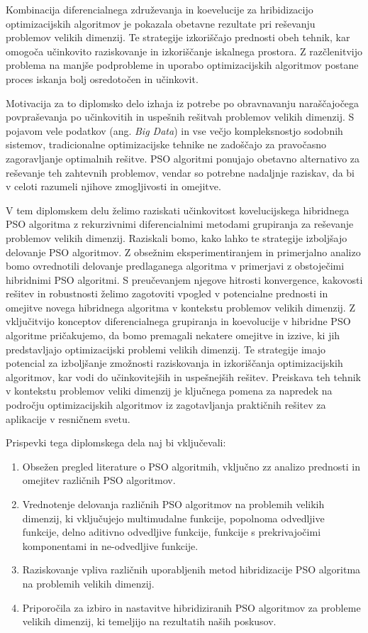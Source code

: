 Kombinacija diferencialnega združevanja in koevelucije za hribidizacijo optimizacijskih algoritmov je pokazala obetavne rezultate pri reševanju problemov velikih dimenzij.
Te strategije izkoriščajo prednosti obeh tehnik, kar omogoča učinkovito raziskovanje in izkoriščanje iskalnega prostora.
Z razčlenitvijo problema na manjše podprobleme in uporabo optimizacijskih algoritmov postane proces iskanja bolj osredotočen in učinkovit.

Motivacija za to diplomsko delo izhaja iz potrebe po obravnavanju naraščajočega povpraševanja po učinkovitih in uspešnih rešitvah problemov velikih dimenzij.
S pojavom vele podatkov (ang. \textit{Big Data}) in vse večjo kompleksnostjo sodobnih sistemov, tradicionalne optimizacijske tehnike ne zadoščajo za pravočasno zagoravljanje optimalnih rešitve.
PSO algoritmi ponujajo obetavno alternativo za reševanje teh zahtevnih problemov, vendar so potrebne nadaljnje raziskav, da bi v celoti razumeli njihove zmogljivosti in omejitve.

V tem diplomskem delu želimo raziskati učinkovitost kovelucijskega hibridnega PSO algoritma z rekurzivnimi diferencialnimi metodami grupiranja za reševanje problemov velikih dimenzij.
Raziskali bomo, kako lahko te strategije izboljšajo delovanje PSO algoritmov.
Z obsežnim eksperimentiranjem in primerjalno analizo bomo ovrednotili delovanje predlaganega algoritma v primerjavi z obstoječimi hibridnimi PSO algoritmi.
S preučevanjem njegove hitrosti konvergence, kakovosti rešitev in robustnosti želimo zagotoviti vpogled v potencialne prednosti in omejitve novega hibridnega algoritma v kontekstu problemov velikih dimenzij.
Z vključitvijo konceptov diferencialnega grupiranja in koevolucije v hibridne PSO algoritme pričakujemo, da bomo premagali nekatere omejitve in izzive, ki jih predstavljajo optimizacijski problemi velikih dimenzij.
Te strategije imajo potencial za izboljšanje zmožnosti raziskovanja in izkoriščanja optimizacijskih algoritmov,  kar vodi do učinkovitejših in uspešnejših rešitev.
Preiskava teh tehnik v kontekstu problemov veliki dimenzij je ključnega pomena za napredek na področju optimizacijskih algoritmov iz zagotavljanja praktičnih rešitev za aplikacije v resničnem svetu.

Prispevki tega diplomskega dela naj bi vključevali:
\begin{enumerate}
    \item Obsežen pregled literature o PSO algoritmih, vključno zz analizo prednosti in omejitev različnih PSO algoritmov.
    \item Vrednotenje delovanja različnih PSO algoritmov na problemih velikih dimenzij, ki vključujejo multimudalne funkcije, popolnoma odvedljive funkcije, delno aditivno odvedljive funkcije, funkcije s prekrivajočimi komponentami in ne-odvedljive funkcije.
    \item Raziskovanje vpliva različnih uporabljenih metod hibridizacije PSO algoritma na problemih velikih dimenzij.
    \item Priporočila za izbiro in nastavitve hibridiziranih PSO algoritmov za probleme velikih dimenzij, ki temeljijo na rezultatih naših poskusov.
\end{enumerate}

